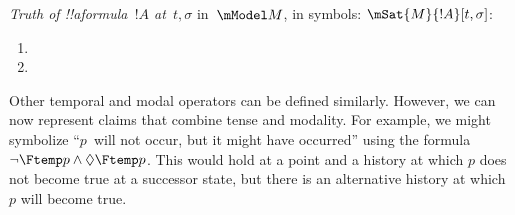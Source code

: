 \documentclass[../../../include/open-logic-section]{subfiles}
\begin{document}
\begin{defn}
  \emph{Truth of !!a{formula}~$!A$ at~$t, \sigma$} in~$\mModel M$, in symbols:
  $\mSat{M}{!A}[t, \sigma]$:
  \begin{enumerate}
\item{}
 \item{}
  \end{enumerate} 
\end{defn}

Other temporal and modal operators can be defined similarly. However, we can now represent claims
that combine tense and modality. For example, we might symbolize ``$p$~will not occur, but it might
have occurred'' using the formula $\lnot \Ftemp p \land \Diamond \Ftemp p$. This would hold at a point and a history
at which $p$ does not become true at a successor state, but there is an alternative history at which $p$
will become true. 
\end{document}
